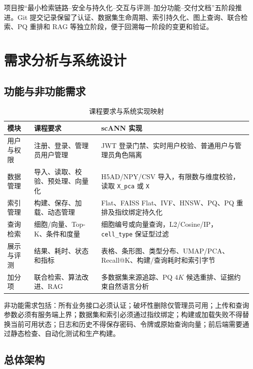 \documentclass[11pt,a4paper]{article}
\newcommand{\code}[1]{\texttt{#1}}
\begin{document}
项目按“最小检索链路--安全与持久化--交互与评测--加分功能--交付文档”五阶段推进。Git 提交记录保留了认证、数据集生命周期、索引持久化、图上查询、联合检索、PQ 重排和 RAG 等独立阶段，便于回溯每一阶段的变更和验证。

\section{需求分析与系统设计}

\subsection{功能与非功能需求}

\begin{table}[htbp]
  \centering
  \caption{课程要求与系统实现映射}
  \label{tab:requirements}
  \begin{tabularx}{\textwidth}{p{}Y Y}
    \toprule
    模块 & 课程要求 & scANN 实现 \\
    \midrule
    用户与权限 & 注册、登录、管理员用户管理 & JWT 登录门禁、实时用户校验、普通用户与管理员角色隔离 \\
    数据管理 & 导入、读取、校验、预处理、向量化 & H5AD/NPY/CSV 导入，有限数与维度校验，读取 \code{X\_pca} 或 \code{X} \\
    索引管理 & 构建、保存、加载、动态管理 & Flat、FAISS Flat、IVF、HNSW、PQ、PQ 重排及指纹绑定持久化 \\
    查询检索 & 细胞/向量、Top-K、条件和度量 & 细胞编号或向量查询，L2/Cosine/IP，\code{cell\_type} 保证型过滤 \\
    展示与评测 & 结果、耗时、状态和指标 & 表格、条形图、类型分布、UMAP/PCA、Recall@K、构建/查询耗时和索引字节 \\
    加分项 & 联合检索、算法改进、RAG & 多数据集来源追踪、PQ $4K$ 候选重排、证据约束自然语言分析 \\
    \bottomrule
  \end{tabularx}
\end{table}

非功能需求包括：所有业务接口必须认证；破坏性删除仅管理员可用；上传和查询参数必须有服务端上界；数据集和索引必须通过指纹绑定；构建或加载失败不得替换当前可用状态；日志和历史不得保存密码、令牌或原始查询向量；前后端需要通过静态检查、自动化测试和生产构建。

\subsection{总体架构}
\end{document}

